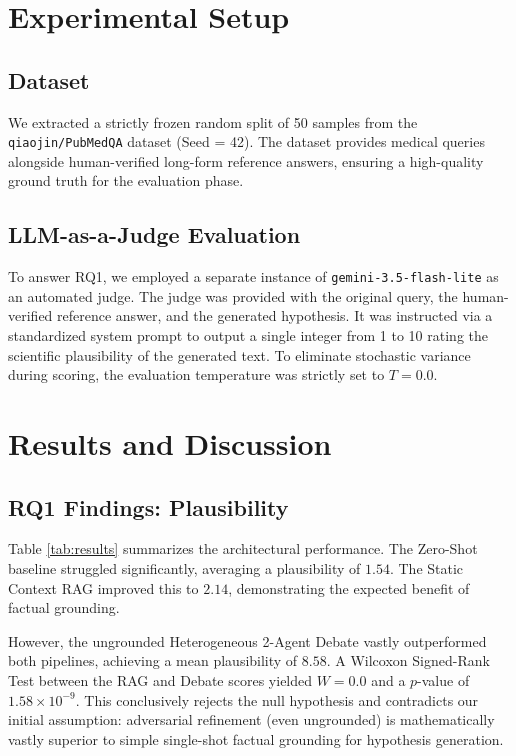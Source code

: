 \documentclass[11pt, conference, onecolumn]{IEEEtran}
\begin{document}
\section{Experimental Setup}

\subsection{Dataset}
We extracted a strictly frozen random split of 50 samples from the \texttt{qiaojin/PubMedQA} dataset (Seed = 42). The dataset provides medical queries alongside human-verified long-form reference answers, ensuring a high-quality ground truth for the evaluation phase. 

\subsection{LLM-as-a-Judge Evaluation}
To answer RQ1, we employed a separate instance of \texttt{gemini-3.5-flash-lite} as an automated judge. The judge was provided with the original query, the human-verified reference answer, and the generated hypothesis. It was instructed via a standardized system prompt to output a single integer from 1 to 10 rating the scientific plausibility of the generated text. To eliminate stochastic variance during scoring, the evaluation temperature was strictly set to $T=0.0$. 

\section{Results and Discussion}

\subsection{RQ1 Findings: Plausibility}
Table \ref{tab:results} summarizes the architectural performance. The Zero-Shot baseline struggled significantly, averaging a plausibility of $1.54$. The Static Context RAG improved this to $2.14$, demonstrating the expected benefit of factual grounding.

However, the ungrounded Heterogeneous 2-Agent Debate vastly outperformed both pipelines, achieving a mean plausibility of $8.58$. A Wilcoxon Signed-Rank Test between the RAG and Debate scores yielded $W = 0.0$ and a $p$-value of $1.58 \times 10^{-9}$. This conclusively rejects the null hypothesis and contradicts our initial assumption: adversarial refinement (even ungrounded) is mathematically vastly superior to simple single-shot factual grounding for hypothesis generation.
\end{document}
